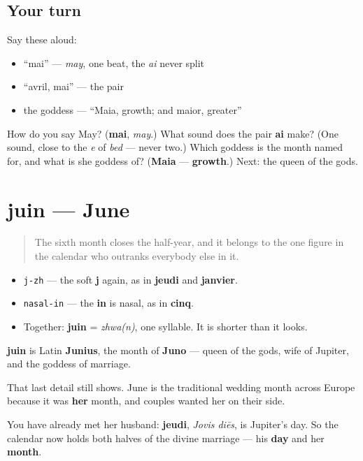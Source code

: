 \subsection*{Your turn}
Say these aloud:

\begin{itemize}
\raggedright
  \item \textquotedblleft{}mai\textquotedblright{} — \emph{may}, one beat, the \emph{ai} never split
  \item \textquotedblleft{}avril, mai\textquotedblright{} — the pair
  \item the goddess — \textquotedblleft{}Maia, growth; and maior, greater\textquotedblright{}
\end{itemize}

\begin{tcolorbox}[breakable,colback=teal!4,colframe=teal!35!black,title={Before you move on}]
How do you say May? (\textbf{mai}, \emph{may}.) What sound does the pair \textbf{ai} make? (One sound, close to the \emph{e} of \emph{bed} — never two.) Which goddess is the month named for, and what is she goddess of? (\textbf{Maia} — \textbf{growth}.) Next: the queen of the gods.
\end{tcolorbox}
\section[juin]{juin — June}

\label{lesson:FR-C09-juin}



\begin{quote}
The sixth month closes the half-year, and it belongs to the one figure in the calendar who outranks everybody else in it.
\end{quote}

\begin{sounds}
\begin{itemize}
\raggedright
  \item \texttt{j-zh} — the soft \textbf{j} again, as in \textbf{jeudi} and \textbf{janvier}.
  \item \texttt{nasal-in} — the \textbf{in} is nasal, as in \textbf{cinq}.
  \item Together: \textbf{juin} = \emph{zhwa(n)}, one syllable. It is shorter than it looks.
\end{itemize}
\end{sounds}

\begin{cousinweb}
\textbf{juin} is Latin \textbf{Junius}, the month of \textbf{Juno} — queen of the gods, wife of Jupiter, and the goddess of marriage.

That last detail still shows. June is the traditional wedding month across Europe because it was \textbf{her} month, and couples wanted her on their side.

You have already met her husband: \textbf{jeudi}, \emph{Jovis diēs}, is Jupiter's day. So the calendar now holds both halves of the divine marriage — his \textbf{day} and her \textbf{month}.
\end{cousinweb}

